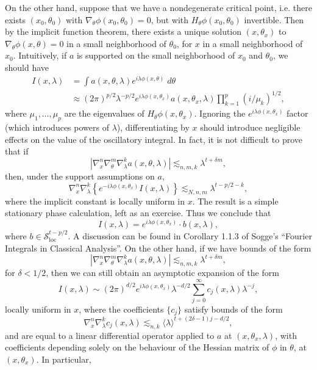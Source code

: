 On the other hand, suppose that we have a nondegenerate critical point, i.e. there exists $(x_0,\theta_0)$ with $\nabla_\theta \phi(x_0,\theta_0) = 0$, but with $H_\theta \phi(x_0,\theta_0)$ invertible. Then by the implicit function theorem, there exists a unique solution $(x,\theta_x)$ to $\nabla_\theta \phi(x,\theta) = 0$ in a small neighborhood of $\theta_0$, for $x$ in a small neighborhood of $x_0$. Intuitively, if $a$ is supported on the small neighborhood of $x_0$ and $\theta_0$, we should have
%
\begin{align*}
    I(x,\lambda) &= \int a(x,\theta,\lambda) e^{i \lambda \phi(x,\theta)}\; d\theta\\
    &\approx (2\pi)^{p/2} \lambda^{-p/2} e^{i \lambda \phi(x,\theta_x)} a(x,\theta_x,\lambda) \prod_{k = 1}^p (i/\mu_k)^{1/2},
\end{align*}
%
where $\mu_1, \dots, \mu_p$ are the eigenvalues of $H_\theta \phi(x,\theta_x)$. Ignoring the $e^{i \lambda \phi(x,\theta_x)}$ factor (which introduces powers of $\lambda$), differentiating by $x$ should introduce negligible effects on the value of the oscillatory integral. In fact, it is not difficult to prove that if
%
\[ \left| \nabla_x^n \nabla_\theta^m \nabla_\lambda^k a(x,\theta,\lambda) \right| \lesssim_{n,m,k} \lambda^{t + \delta m}, \]
%
then, under the support assumptions on $a$,
%
\[ \nabla_x^n \nabla_\lambda^k \left\{ e^{- i \lambda \phi(x,\theta_x)} I (x,\lambda) \right\} \lesssim_{N,n,m} \lambda^{t - p/2 - k}, \]
%
where the implicit constant is locally uniform in $x$. The result is a simple stationary phase calculation, left as an exercise. Thus we conclude that
%
\[ I(x,\lambda) = e^{i \lambda \phi(x,\theta_x)} \cdot b(x,\lambda), \]
%
where $b \in \mathcal{S}^{t-p/2}_{\text{loc}}$. A discussion can be found in Corollary 1.1.3 of Sogge's ``Fourier Integrals in Classical Analysis''. On the other hand, if we have bounds of the form
%
\[ \left| \nabla_x^n \nabla_\theta^m \nabla_\lambda^k a(x,\theta,\lambda) \right| \lesssim_{n,m,k} \lambda^{t + \delta m}, \]
%
for $\delta < 1/2$, then we can still obtain an asymptotic expansion of the form
%
\[ I(x,\lambda) \sim (2\pi)^{d/2} e^{i \lambda \phi(x,\theta_x)} \lambda^{-d/2} \sum_{j = 0}^\infty c_j(x,\lambda) \lambda^{-j}, \]
%
locally uniform in $x$, where the coefficients $\{ c_j \}$ satisfy bounds of the form
%
\[ \nabla^n_x \nabla^k_\lambda c_j(x,\lambda) \lesssim_{n,k} \langle \lambda \rangle^{t + (2 \delta - 1) j - d/2}, \]
%
and are equal to a linear differential operator applied to $a$ at $(x,\theta_x,\lambda)$, with coefficients depending solely on the behaviour of the Hessian matrix of $\phi$ in $\theta$, at $(x,\theta_x)$. In particular,
